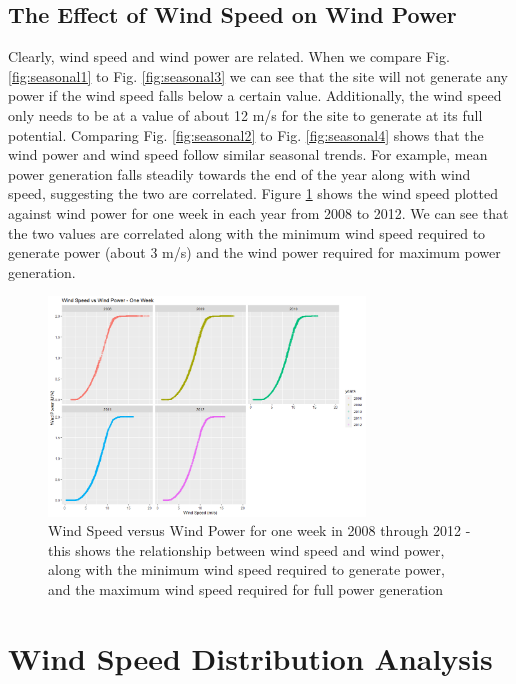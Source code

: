 \documentclass{IEEEtran}
\begin{document}
  \subsection{The Effect of Wind Speed on Wind Power}

  Clearly, wind speed and wind power are related. When we compare Fig. \ref{fig:seasonal1} to Fig. \ref{fig:seasonal3} we can see that the site will not generate any power if the wind speed falls below a certain value. Additionally, the wind speed only needs to be at a value of about 12 m/s for the site to generate at its full potential. Comparing Fig. \ref{fig:seasonal2} to Fig. \ref{fig:seasonal4} shows that the wind power and wind speed follow similar seasonal trends. For example, mean power generation falls steadily towards the end of the year along with wind speed, suggesting the two are correlated. Figure \ref{fig:comparison} shows the wind speed plotted against wind power for one week in each year from 2008 to 2012. We can see that the two values are correlated along with the minimum wind speed required to generate power (about 3 m/s) and the wind power required for maximum power generation.

  \begin{figure}
    \centering
    \includegraphics[width=0.75\textwidth]{figures/correlation}
    \caption{Wind Speed versus Wind Power for one week in 2008 through 2012 - this shows the relationship between wind speed and wind power, along with the minimum wind speed required to generate power, and the maximum wind speed required for full power generation}
    \label{fig:comparison}
  \end{figure}



  \section{Wind Speed Distribution Analysis}
\end{document}
